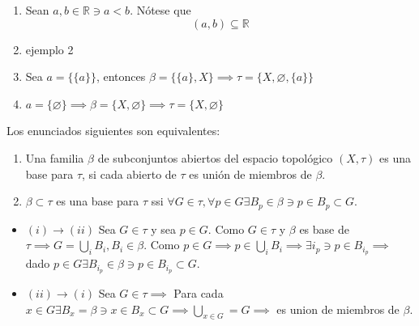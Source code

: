 \begin{ejemplo}
    \begin{enumerate}
        \item Sean $a,b\in\mathbb{R}\ni a<b$. Nótese que 
        $$(a,b)\subseteq \mathbb{R}$$
        \item ejemplo 2
        \item Sea $a=\{\{a\}\}$, entonces $\beta=\{\{a\},X\}\implies \tau=\{X,\varnothing,\{a\}\}$
        \item $a=\{\varnothing\}\implies \beta=\{X,\varnothing\}\implies \tau=\{X,\varnothing\}$
    \end{enumerate}
    
\end{ejemplo}
\begin{teorema}
    Los enunciados siguientes son equivalentes:
    \begin{enumerate}
        \item Una familia $\beta$ de subconjuntos abiertos del espacio topológico $(X,\tau)$ es una base para $\tau$, si cada abierto de $\tau$ es unión de miembros de $\beta$.
        \item $\beta\subset \tau$ es una base para $\tau$ ssi $\forall G\in \tau,\forall p\in G\exists B_p\in \beta \ni p\in B_p\subset G$.
    \end{enumerate}
    \begin{dem}
        \begin{itemize}
            \item $(i)\to(ii)$ Sea $G\in \tau$ y sea $p\in G$. Como $G\in\tau$ y $\beta$ es base de $\tau\implies G=\bigcup_iB_i,B_i\in \beta$. Como $p\in G\implies p \in \bigcup_i B_i\implies \exists i_p\ni p\in B_{i_p}\implies $ dado $p\in G\exists B_{i_p}\in \beta \ni p\in B_{i_p}\subset G$. 
            \item $(ii)\to (i)$ Sea $G\in \tau\implies$ Para cada $x\in G\exists B_x=\beta \ni x\in B_x\subset G\implies \bigcup_{x\in G}=G\implies$ es union de miembros de $\beta$.  
        \end{itemize}
    \end{dem}
\end{teorema}
